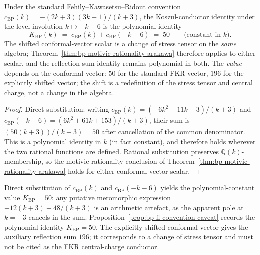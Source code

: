 \begin{proposition}
\ClaimStatusProvedHere
Under the standard Fehily--Kawasetsu--Ridout convention
$c_{\mathrm{BP}}(k) = -(2k+3)(3k+1)/(k+3)$, the
Koszul-conductor identity under the level involution $k \mapsto -k-6$
is the polynomial identity
\[
 K_{\mathrm{BP}}(k) \;=\;
 c_{\mathrm{BP}}(k) + c_{\mathrm{BP}}(-k-6)
 \;=\; 50
 \qquad \text{(constant in } k \text{).}
\]
The shifted conformal-vector scalar is a change of stress tensor on
the \emph{same} algebra; Theorem~\ref{thm:bp-motivic-rationality-arakawa}
therefore applies to either scalar, and the reflection-sum identity
remains polynomial in both. The \emph{value} depends on the conformal
vector: $50$ for the standard FKR vector, $196$ for the explicitly
shifted vector; the shift is a redefinition of the stress tensor and
central charge, not a change in the algebra.
\end{proposition}

\begin{proof}
Direct substitution: writing
$c_{\mathrm{BP}}(k) = (-6k^2 - 11k - 3)/(k + 3)$ and
$c_{\mathrm{BP}}(-k-6) = (6k^2 + 61k + 153)/(k + 3)$,
their sum is $(50(k+3))/(k+3) = 50$ after cancellation of the common
denominator. This is a polynomial identity in $k$ (in fact constant),
and therefore holds wherever the two rational functions are defined.
Rational substitution preserves
$\mathbb{Q}(k)$-membership, so the motivic-rationality conclusion of
Theorem~\ref{thm:bp-motivic-rationality-arakawa} holds for either
conformal-vector scalar.
\end{proof}

\begin{remark}
Direct substitution of $c_{\mathrm{BP}}(k)$ and
$c_{\mathrm{BP}}(-k-6)$ yields the polynomial-constant
value $K_{\mathrm{BP}} = 50$: any putative meromorphic
expression $-12(k+3) - 48/(k+3)$ is an arithmetic artefact, as the
apparent pole at $k = -3$ cancels in the sum.
Proposition~\ref{prop:bp-fl-convention-caveat} records the polynomial
identity $K_{\mathrm{BP}} = 50$. The explicitly shifted conformal
vector gives the auxiliary reflection sum $196$; it corresponds to a
change of stress tensor and must not be cited as the FKR
central-charge conductor.
\end{remark}

